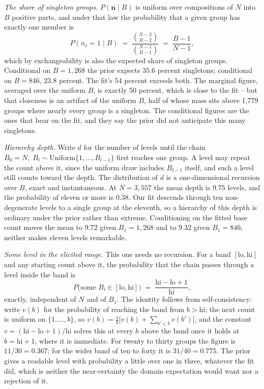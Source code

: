 \documentclass[11pt]{article}
\begin{document}
\emph{The share of singleton groups.} $P(\bm{n} \mid B)$ is uniform over
compositions of $N$ into $B$ positive parts, and under that law the
probability that a given group has exactly one member is
\begin{equation}
P(n_r = 1 \mid B) \;=\; \frac{\binom{N-2}{B-2}}{\binom{N-1}{B-1}}
  \;=\; \frac{B-1}{N-1},
\label{eq:singleton}
\end{equation}
which by exchangeability is also the expected share of singleton groups.
Conditional on $B = 1{,}268$ the prior expects $35.6$ percent singletons;
conditional on $B = 846$, $23.8$ percent. The fit's 54 percent exceeds both.
The marginal figure, averaged over the uniform $B$, is exactly 50 percent,
which is close to the fit -- but that closeness is an artifact of the uniform
$B$, half of whose mass sits above 1{,}779 groups where nearly every group is
a singleton. The conditional figures are the ones that bear on the fit, and
they say the prior did not anticipate this many singletons.

\emph{Hierarchy depth.} Write $d$ for the number of levels until the chain
$B_0 = N,\; B_l \sim \mathrm{Uniform}\{1, \dots, B_{l-1}\}$ first reaches
one group. A level may repeat the count above it, since the uniform draw
includes $B_{l-1}$ itself, and such a level still counts toward the depth.
The distribution of $d$ is a one-dimensional recursion over $B$, exact and
instantaneous. At $N = 3{,}557$ the mean depth is $9.75$ levels, and the
probability of eleven or more is $0.38$. Our fit descends through ten
non-degenerate levels to a single group at the eleventh, so a hierarchy of
this depth is ordinary under the prior rather than extreme. Conditioning on
the fitted base count moves the mean to $9.72$ given $B_1 = 1{,}268$ and to
$9.32$ given $B_1 = 846$; neither makes eleven levels remarkable.

\emph{Some level in the elicited range.} This one needs no recursion. For a
band $[\mathrm{lo}, \mathrm{hi}]$ and any starting count above it, the
probability that the chain passes through a level inside the band is
\begin{equation}
P\big(\text{some } B_l \in [\mathrm{lo}, \mathrm{hi}]\big)
  \;=\; \frac{\mathrm{hi} - \mathrm{lo} + 1}{\mathrm{hi}},
\label{eq:band}
\end{equation}
exactly, independent of $N$ and of $B_1$. The identity follows from
self-consistency: write $v(b)$ for the probability of reaching the band from
$b > \mathrm{hi}$; the next count is uniform on $\{1, \dots, b\}$, so
$v(b) = \frac{1}{b}\big[v(b) + \sum_{b' < b} v(b')\big]$, and the constant
$v = (\mathrm{hi} - \mathrm{lo} + 1)/\mathrm{hi}$ solves this at every $b$
above the band once it holds at $b = \mathrm{hi} + 1$, where it is immediate.
For twenty to thirty groups the figure is $11/30 = 0.367$; for the wider band
of ten to forty it is $31/40 = 0.775$. The prior gives a readable level with
probability a little over one in three, whatever the fit did, which is neither
the near-certainty the domain expectation would want nor a rejection of it.
\end{document}
